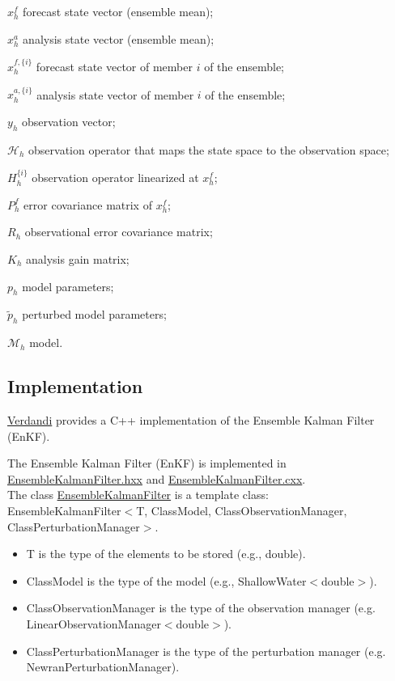 \documentclass{tufte-book}
\begin{document}
 $x_h^f$ forecast state vector (ensemble mean); \par
 $x_h^a$ analysis state vector (ensemble mean); \par
 $x_h^{f, \{i\}}$ forecast state vector of member $i$ of the ensemble; \par
 $x_h^{a, \{i\}}$ analysis state vector of member $i$ of the ensemble; \par
 $y_h$ observation vector; \par
 $\mathcal{H}_h$ observation operator that maps the state space to the observation space; \par
 $H^{\{i\}}_h$ observation operator linearized at $x^f_h$; \par
 $P_h^{f}$ error covariance matrix of $x_h^f$; \par
 $R_h$ observational error covariance matrix; \par
 $K_h$ analysis gain matrix; \par
 $p_h$ model parameters; \par
 $\widetilde p_h$ perturbed model parameters; \par
 $\mathcal{M}_h$ model.


 \hypertarget{ensemble_kalman_filter_implementation}{}\subsection{\-Implementation}\label{ensemble_kalman_filter_implementation}

 \hyperlink{namespace_verdandi}{\-Verdandi} provides a \-C++ implementation of the \-Ensemble \-Kalman \-Filter (\-En\-K\-F).

 \-The \-Ensemble \-Kalman \-Filter (\-En\-K\-F) is implemented in {\ttfamily \hyperlink{_ensemble_kalman_filter_8hxx_source}{\-Ensemble\-Kalman\-Filter.\-hxx}} and {\ttfamily \hyperlink{_ensemble_kalman_filter_8cxx_source}{\-Ensemble\-Kalman\-Filter.\-cxx}}. \\
 \-The class {\ttfamily  \hyperlink{class_verdandi_1_1_ensemble_kalman_filter}{\-Ensemble\-Kalman\-Filter}} is a template class\-:\\
  {\ttfamily \-Ensemble\-Kalman\-Filter$<$\-T, Class\-Model, Class\-Observation\-Manager, Class\-Perturbation\-Manager$>$}.
  \begin{itemize}
  \item {\ttfamily \-T} is the type of the elements to be stored (e.\-g., {\ttfamily double}).
  \item {\ttfamily \-Class\-Model} is the type of the model (e.\-g., {\ttfamily \-Shallow\-Water$<$double$>$}).
  \item {\ttfamily \-Class\-Observation\-Manager} is the type of the observation manager (e.\-g. {\ttfamily \-Linear\-Observation\-Manager$<$double$>$}).
  \item {\ttfamily \-Class\-Perturbation\-Manager} is the type of the perturbation manager (e.\-g. {\ttfamily \-Newran\-Perturbation\-Manager}).
  \end{itemize}
\end{document}
